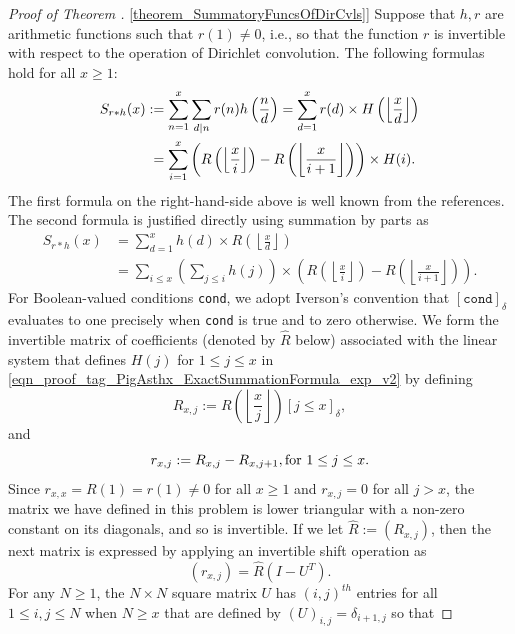 \documentclass[11pt,reqno,a4letter]{article}
\newcommand{\hlocalref}[1]{\hyperref[#1]{\ref{#1}}}
\numberwithin{equation}{section}
\numberwithin{figure}{section}
\numberwithin{table}{section}
\newcommand{\Iverson}[1]{\ensuremath{\left[#1\right]_{\delta}}}
\newcommand{\floor}[1]{\left\lfloor #1 \right\rfloor}
\newcommand{\Floor}[2]{\ensuremath{\left\lfloor \frac{#1}{#2} \right\rfloor}}
\theoremstyle{plain}
\numberwithin{theorem}{section}
\theoremstyle{definition}
\theoremstyle{remark}
\newcommand{\mathtext}[1]{\text{\rm #1}}
\begin{document}
\begin{proof}[Proof of Theorem \hlocalref{theorem_SummatoryFuncsOfDirCvls}] 
\label{proofOf_theorem_SummatoryFuncsOfDirCvls} 
Suppose that $h,r$ are arithmetic functions such that $r(1) \neq 0$, i.e., so that 
the function $r$ is invertible with respect to the operation of Dirichlet convolution. 
The following formulas hold for all $x \geq 1$: 
\begin{align} 
\notag 
S_{r \ast h}(x) & := \sum_{n=1}^{x} \sum_{d|n} r(n) h\left(\frac{n}{d}\right) = 
     \sum_{d=1}^x r(d) \times H\left(\floor{\frac{x}{d}}\right) \\ 
\label{eqn_proof_tag_PigAsthx_ExactSummationFormula_exp_v2} 
     & \phantom{:} = 
     \sum_{i=1}^x \left(R\left(\floor{\frac{x}{i}}\right) - R\left(\floor{\frac{x}{i+1}}\right)\right) \times H(i). 
\end{align} 
The first formula on the right-hand-side above is well known from the references. 
The second formula is justified directly using 
summation by parts as \cite[\S 2.10(ii)]{NISTHB} 
\begin{align*} 
S_{r \ast h}(x) & = \sum_{d=1}^x h(d) \times R\left(\floor{\frac{x}{d}}\right) \\ 
     & = \sum_{i \leq x} \left(\sum_{j \leq i} h(j)\right) \times 
     \left(R\left(\floor{\frac{x}{i}}\right) - 
     R\left(\floor{\frac{x}{i+1}}\right)\right). 
\end{align*} 
For Boolean-valued conditions \texttt{cond}, we adopt Iverson's convention that 
$\Iverson{\mathtt{cond}}$ evaluates to one precisely when 
\texttt{cond} is true and to zero otherwise.
We form the invertible matrix of coefficients (denoted by $\hat{R}$ below) 
associated with the linear system that defines $H(j)$ for 
$1 \leq j \leq x$ in \eqref{eqn_proof_tag_PigAsthx_ExactSummationFormula_exp_v2} by defining
\[
R_{x,j} := R\left(\Floor{x}{j}\right) \Iverson{j \leq x}, 
\]
and 
\[
r_{x,j} := R_{x,j} - R_{x,j+1}, \mathtext{ for } 1 \leq j \leq x. 
\] 
Since $r_{x,x} = R(1) = r(1) \neq 0$ for all $x \geq 1$ and $r_{x,j} = 0$ for all $j > x$, 
the matrix we have defined in this problem is lower triangular with a non-zero 
constant on its diagonals, and so is invertible. 
If we let $\hat{R} := (R_{x,j})$, then the next matrix is 
expressed by applying an invertible shift operation as 
\[
(r_{x,j}) = \hat{R} \left(I - U^{T}\right). 
\]
For any $N \geq 1$, the $N \times N$ square matrix $U$ 
has $(i,j)^{th}$ entries for all $1 \leq i,j \leq N$ when $N \geq x$ that are defined by 
$(U)_{i,j} = \delta_{i+1,j}$ so that 

\end{proof}
\end{document}
